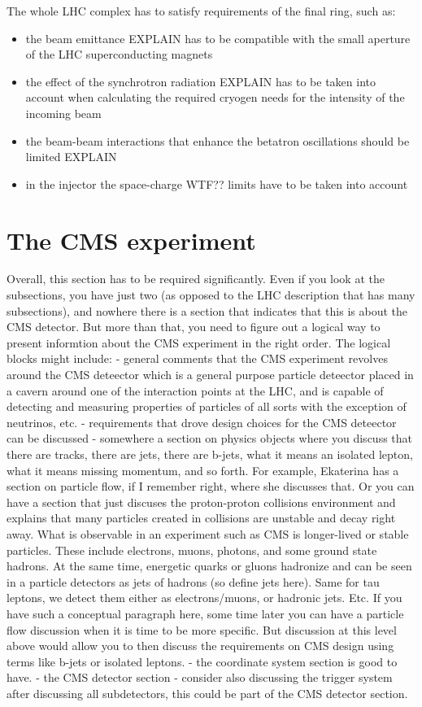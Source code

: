 The whole LHC complex has to satisfy requirements of the final ring, such as:
\begin{itemize}
\item the beam emittance EXPLAIN has to be compatible with the small aperture of the LHC superconducting magnets
\item the effect of the synchrotron radiation EXPLAIN has to be taken into account when calculating the required cryogen needs for the intensity of the incoming beam
\item the beam-beam interactions that enhance the betatron oscillations should be limited EXPLAIN
\item in the injector the space-charge WTF?? limits have to be taken into account
\end{itemize}

\section{The CMS experiment}

Overall, this section has to be required significantly. 
   Even if you look at the subsections, you have just two (as opposed to the LHC  description that has many subsections), and nowhere there is a section that indicates that this is about the CMS detector.
   But more than that, you need to figure out a logical way to present informtion about the CMS experiment in the right order. The logical blocks might include:
  - general comments that the CMS experiment revolves around the CMS deteector which is a general purpose particle deteector placed in a cavern around one of the interaction points at the LHC, and is capable of detecting and measuring properties of particles of all sorts with the exception of neutrinos, etc.
  - requirements that drove design choices for the CMS deteector can be discussed
  - somewhere a section on physics objects where you discuss that there are tracks, there are jets, there are b-jets, what it means an isolated lepton, what it means missing momentum, and so forth. For example, Ekaterina has a section on particle flow, if I remember right, where she discusses that. Or you can have a section that just discuses the proton-proton collisions environment and explains that many particles created in collisions are unstable and decay right away. What is observable in an experiment such as CMS is longer-lived or stable particles. These include electrons, muons, photons, and some ground state hadrons. At the same time, energetic quarks or gluons hadronize and can be seen in a particle detectors as jets of hadrons (so define jets here). Same for tau leptons, we detect them either as electrons/muons, or hadronic jets. Etc. If you have such a conceptual paragraph here, some time later you can have a particle flow discussion when it is time to be more specific. But discussion at this level above would allow you to then discuss the requirements on CMS design using terms like b-jets or isolated leptons.
  - the coordinate system section is good to have.
  - the CMS detector section
  - consider also discussing the trigger system after discussing all subdetectors, this could be part of the CMS detector section. 
  
